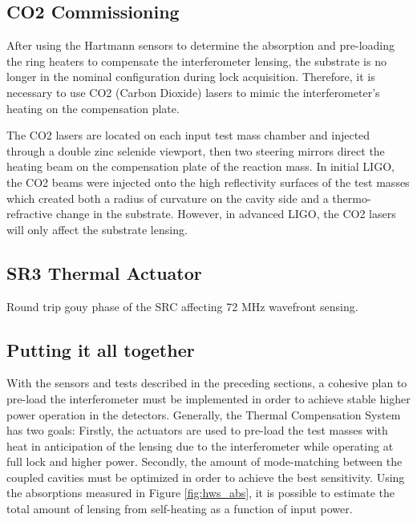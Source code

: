 	
	\subsection{CO2 Commissioning}\label{Sec:CO2}
	After using the Hartmann sensors to determine the absorption and pre-loading the ring heaters to compensate the interferometer lensing, the substrate is no longer in the nominal configuration during lock acquisition.  Therefore, it is necessary to use CO2 (Carbon Dioxide) lasers to mimic the interferometer's heating on the compensation plate.
	
	The CO2 lasers are located on each input test mass chamber and injected through a double zinc selenide viewport, then two steering mirrors direct the heating beam on the compensation plate of the reaction mass.  In initial LIGO, the CO2 beams were injected onto the high reflectivity surfaces of the test masses which created both a radius of curvature on the cavity side and a thermo-refractive change in the substrate.  However, in advanced LIGO, the CO2 lasers will only affect the substrate lensing.	
	
	\subsection{SR3 Thermal Actuator}
	Round trip gouy phase of the SRC affecting 72 MHz wavefront sensing.
	
	\subsection{Putting it all together}
	With the sensors and tests described in the preceding sections, a cohesive plan to pre-load the interferometer must be implemented in order to achieve stable higher power operation in the detectors.  Generally, the Thermal Compensation System has two goals: Firstly, the actuators are used to pre-load the test masses with heat in anticipation of the lensing due to the interferometer while operating at full lock and higher power.  Secondly, the amount of mode-matching between the coupled cavities must be optimized in order to achieve the best sensitivity.  Using the absorptions measured in Figure \ref{fig:hws_abs}, it is possible to estimate the total amount of lensing from self-heating as a function of input power.
	
